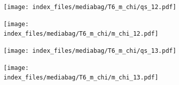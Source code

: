 \documentclass[
  11pt,
  letterpaper,
]{scrreprt}
\begin{document}
\begin{figure}

\begin{minipage}{0.50\linewidth}

\begin{figure}[H]

{\centering \texttt{[image: index\_files/mediabag/T6\_m\_chi/qs\_12.pdf]}

}


\end{figure}%

\end{minipage}%
%
\begin{minipage}{0.50\linewidth}

\begin{figure}[H]

{\centering \texttt{[image: index\_files/mediabag/T6\_m\_chi/m\_chi\_12.pdf]}

}


\end{figure}%

\end{minipage}%

\end{figure}%

\begin{figure}

\begin{minipage}{0.50\linewidth}

\begin{figure}[H]

{\centering \texttt{[image: index\_files/mediabag/T6\_m\_chi/qs\_13.pdf]}

}


\end{figure}%

\end{minipage}%
%
\begin{minipage}{0.50\linewidth}

\begin{figure}[H]

{\centering \texttt{[image: index\_files/mediabag/T6\_m\_chi/m\_chi\_13.pdf]}

}


\end{figure}%

\end{minipage}%

\end{figure}%
\end{document}
